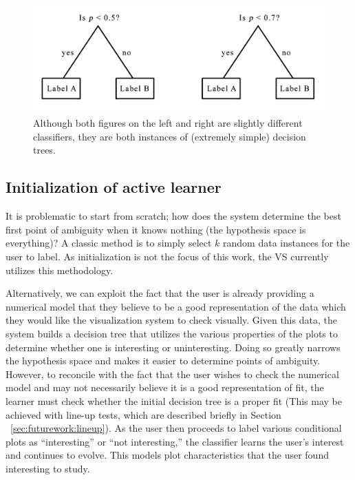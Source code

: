 \begin{figure}[htb]
	\begin{center}
		\includegraphics[width=0.75\linewidth]{ch-visualizer/figures/tree}
		\caption[Classifiers and classification models]{Although both figures 
		on the left and right are slightly different classifiers, they 
		are both instances of (extremely simple) decision trees.}
		\label{fig:visualizer:al:tree}
	\end{center}
\end{figure}

\subsection{Initialization of active learner}
\label{sec:visualizer:al:initialization}

It is problematic to start from scratch; how does the system determine
the best first point of ambiguity when it knows nothing (the hypothesis space is
everything)? A classic method is to simply select $k$ random data instances for 
the user to label. As initialization is not the focus of this work, the VS 
currently utilizes this methodology.

Alternatively, we can exploit the fact that the
user is already providing a numerical model that they believe to be a good
representation of the data which they would like the visualization system to
check visually. Given this data, the system builds a decision tree that utilizes
the various properties of the plots to determine whether one is interesting or
uninteresting. Doing so greatly narrows the hypothesis space and makes it easier
to determine points of ambiguity. However, to reconcile with the fact that the
user wishes to check the numerical model and may not necessarily believe it is a
good representation of fit, the learner must check whether the initial decision
tree is a proper fit (This may be achieved with line-up tests, which are 
described briefly in Section ~\ref{sec:futurework:lineup}). As the user then 
proceeds to label various conditional
plots as ``interesting'' or ``not interesting,'' the classifier learns the
user’s interest and continues to evolve. This models plot characteristics that
the user found interesting to study.

